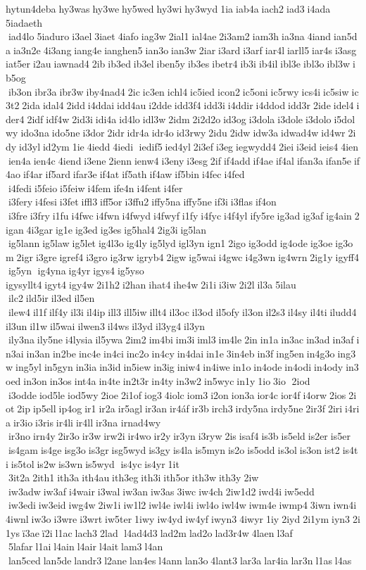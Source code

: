 hytun4deba hy3was hy3we hy5wed hy3wi hy3wyd 1ia iab4a iach2 iad3 i4ada 	5iadaeth  iad4lo 5iaduro i3ael 3iaet 4iafo iag3w 2ial1 ial4ae 2i3am2 iam3h ia3na 4iand ian5da ia3n2e 4i3ang iang4e ianghen5 ian3o ian3w 2iar i3ard i3arf iar4l iarll5 iar4s i3asg iat5er i2au iawnad4 2ib ib3ed ib3el iben5y ib3es ibetr4 ib3i ib4il ibl3e ibl3o ibl3w ib5og  ib3on ibr3a ibr3w iby4nad4 2ic ic3en ichl4 ic5ied icon2 ic5oni ic5rwy ics4i ic5siw ic3t2 2ida idal4 2idd i4ddai idd4au i2dde idd3f4 idd3i i4ddir i4ddod idd3r 2ide idel4 ider4 2idf idf4w 2id3i idi4a id4lo idl3w 2idm 2i2d2o id3og i3dola i3dole i3dolo i5dolwy ido3na ido5ne i3dor 2idr idr4a idr4o id3rwy 2idu 2idw idw3a idwad4w id4wr 2idy id3yl id2ym 1ie 4iedd 4iedi  iedif5 ied4yl 2i3ef i3eg iegwydd4 2iei i3eid ieis4 4ien  ien4a ien4c 4iend i3ene 2ienn ienw4 i3eny i3esg 2if if4add if4ae if4al ifan3a ifan5e if4ao if4ar if5ard ifar3e if4at if5ath if4aw if5bin i4fec i4fed  i4fedi i5feio i5feiw i4fem ife4n i4fent i4fer  i3fery i4fesi i3fet iffl3 iff5or i3ffu2 iffy5na iffy5ne if3i i3flas if4on  i3fre i3fry i1fu i4fwc i4fwn i4fwyd i4fwyf i1fy i4fyc i4f4yl ify5re ig3ad ig3af ig4ain 2igan 4i3gar ig1e ig3ed ig3es ig5hal4 2ig3i ig5lan  ig5lann ig5law ig5let ig4l3o ig4ly ig5lyd igl3yn ign1 2igo ig3odd ig4ode ig3oe ig3om 2igr i3gre igref4 i3gro ig3rw igryb4 2igw ig5wai i4gwc i4g3wn ig4wrn 2ig1y igyff4 ig5yn  ig4yna ig4yr igys4 ig5yso 	igysyllt4 igyt4 igy4w 2i1h2 i2han ihat4 ihe4w 2i1i i3iw 2i2l il3a 5ilau  ilc2 ild5ir il3ed il5en  ilew4 il1f ilf4y il3i il4ip ill3 ill5iw illt4 il3oc il3od il5ofy il3on il2s3 il4sy il4ti iludd4 il3un il1w il5wai ilwen3 il4ws il3yd il3yg4 il3yn  ily3na ily5ne i4lysia il5ywa 2im2 im4bi im3i iml3 im4le 2in in1a in3ac in3ad in3af in3ai in3an in2be inc4e in4ci inc2o in4cy in4dai in1e 3in4eb in3f ing5en in4g3o ing3w ing5yl in5gyn in3ia in3id in5iew in3ig iniw4 in4iwe in1o in4ode in4odi in4ody in3oed in3on in3os int4a in4te in2t3r in4ty in3w2 in5wyc in1y 1io 3io  2iod  i3odde iod5le iod5wy 2ioe 2i1of iog3 4iolc iom3 i2on ion3a ior4c ior4f i4orw 2ios 2iot 2ip ip5ell ip4og ir1 ir2a ir5agl ir3an ir4áf ir3b irch3 irdy5na irdy5ne 2ir3f 2iri i4ria ir3io i3ris ir4li ir4ll ir3na 	irnad4wy  ir3no irn4y 2ir3o ir3w irw2i ir4wo ir2y ir3yn i3ryw 2is isaf4 is3b is5eld is2er is5er  is4gam is4ge isg3o is3gr isg5wyd is3gy is4la is5myn is2o is5odd is3ol is3on ist2 is4ti is5tol is2w is3wn is5wyd  is4yc is4yr 1it  3it2a 2ith1 ith3a ith4au ith3eg ith3i ith5or ith3w ith3y 2iw  iw3adw iw3af i4wair i3wal iw3an iw3as 3iwc iw4ch 2iw1d2 iwd4i iw5edd  iw3edi iw3eid iwg4w 2iw1i iw1l2 iwl4e iwl4i iwl4o iwl4w iwm4e iwmp4 3iwn iwn4i 4iwnl iw3o i3wre i3wrt iw5ter 1iwy iw4yd iw4yf iwyn3 4iwyr 1iy 2iyd 2i1ym iyn3 2i1ys ï3ae ï2i l1ac lach3 2lad  l4ad4d3 lad2m lad2o lad3r4w 4laen l3af  5lafar l1ai l4ain l4air l4ait lam3 l4an  lan5ced lan5de landr3 l2ane lan4es l4ann lan3o 4lant3 lar3a lar4ia lar3n l1as l4as 
